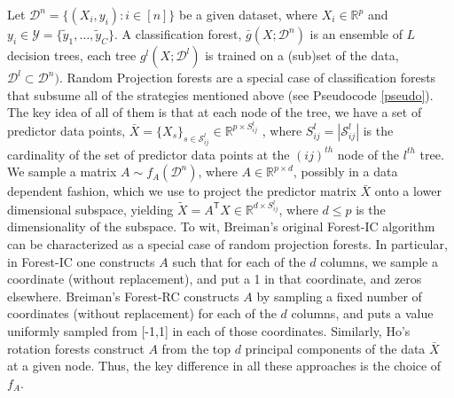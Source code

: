 \documentclass{article}
\newcommand{\Real}{\mathbb{R}}
\providecommand{\mc}[1]{\mathcal{#1}}
\providecommand{\mt}[1]{\widetilde{#1}}
\newcommand{\T}{^{\ensuremath{\mathsf{T}}}}           %
\begin{document}
Let $\mc{D}^n=\{(X_i,y_i): i \in [n]\}$ be a given dataset, where $X_i \in \Real^p$ and $y_i \in \mc{Y} = \{\mt{y}_1,\ldots, \mt{y}_C\}$. A classification forest, $\bar{g}(X; \mc{D}^n)$ is an ensemble of $L$ decision trees, each tree $g^l( X; \mc{D}^l)$ is trained on a (sub)set of the data, $\mc{D}^l \subset \mc{D}^n)$.
Random Projection forests are a special case of classification forests that subsume all of the strategies mentioned above (see Pseudocode \ref{pseudo}). The key idea of all of them is that at each node of the tree, we have a set of predictor data points, $\bar{X}=\{X_s\}_{s \in \mc{S}^l_{ij}} \in \Real^{p \times S^l_{ij}}$ , where  $S^l_{ij}=|\mc{S}^l_{ij}|$ is the cardinality of the set of predictor data points at the $(ij)^{th}$ node of the $l^{th}$ tree.
We sample a matrix $A \sim f_A(\mc{D}^n)$, where $A \in \Real^{p \times d}$, possibly in a data dependent fashion, which we use to project the predictor matrix $\bar{X}$ onto a lower dimensional subspace, yielding $\mt{X} = A\T X \in \Real^{d \times S^l_{ij}}$, where $d \leq p$ is the dimensionality of the subspace. To wit, Breiman's original Forest-IC algorithm can be characterized as a special case of random projection forests. In particular, in Forest-IC one constructs $A$ such that for each of the $d$ columns, we sample a coordinate (without replacement), and put a 1 in that coordinate, and zeros elsewhere. Breiman's Forest-RC constructs $A$ by sampling a fixed number of coordinates (without replacement) for each of the $d$ columns, and puts a value uniformly sampled from [-1,1] in each of those coordinates. Similarly, Ho's rotation forests construct $A$ from the top $d$ principal components of the data $\bar{X}$ at a given node. Thus, the key difference in all these approaches is the choice of $f_A$. 
\end{document}
